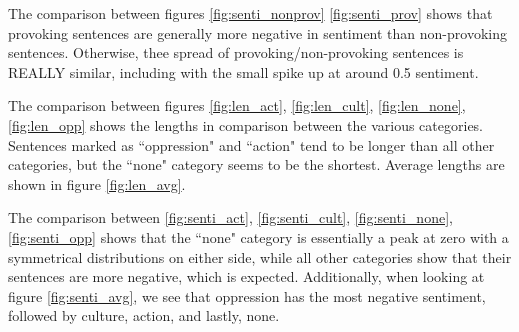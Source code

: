 \documentclass[11pt,letterpaper]{article}
\begin{document}
The comparison between figures \ref{fig:senti_nonprov} \ref{fig:senti_prov} shows that provoking sentences are generally more negative in sentiment than non-provoking sentences. Otherwise, thee spread of provoking/non-provoking sentences is REALLY similar, including with the small spike up at around 0.5 sentiment.

The comparison between figures \ref{fig:len_act}, \ref{fig:len_cult}, \ref{fig:len_none}, \ref{fig:len_opp} shows the lengths in comparison between the various categories. Sentences marked as ``oppression" and ``action" tend to be longer than all other categories, but the ``none" category seems to be the shortest. Average lengths are shown in figure \ref{fig:len_avg}.

The comparison between \ref{fig:senti_act}, \ref{fig:senti_cult}, \ref{fig:senti_none}, \ref{fig:senti_opp} shows that the ``none" category is essentially a peak at zero with a symmetrical distributions on either side, while all other categories show that their sentences are more negative, which is expected. Additionally, when looking at figure \ref{fig:senti_avg}, we see that oppression has the most negative sentiment, followed by culture, action, and lastly, none.
\end{document}
